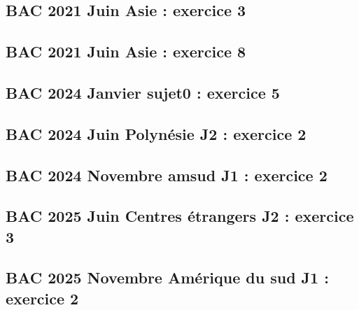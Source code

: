 \documentclass[lang=fr,edition=teacher,layout=sheet]{mxbook}
\begin{document}
\subsection*{BAC 2021 Juin Asie : exercice 3}
\begingroup\endgroup
\par\bigskip
{}\subsection*{BAC 2021 Juin Asie : exercice 8}
\begingroup\endgroup
\par\bigskip
{}\subsection*{BAC 2024 Janvier sujet0 : exercice 5}
\begingroup\endgroup
\par\bigskip
{}\subsection*{BAC 2024 Juin Polynésie J2 : exercice 2}
\begingroup\endgroup
\par\bigskip
{}\subsection*{BAC 2024 Novembre amsud J1 : exercice 2}
\begingroup\endgroup
\par\bigskip
{}\subsection*{BAC 2025 Juin Centres étrangers J2 : exercice 3}
\begingroup\endgroup
\par\bigskip
{}\subsection*{BAC 2025 Novembre Amérique du sud J1 : exercice 2}
\begingroup\endgroup
\end{document}
